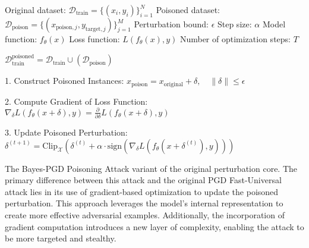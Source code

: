 Original dataset: $\mathcal{D}_{\text{train}} = \{(x_i, y_i)\}_{i=1}^{N}$  
Poisoned dataset: $\mathcal{D}_{\text{poison}} = \{(x_{\text{poison},j}, y_{\text{target},j})\}_{j=1}^{M}$  
Perturbation bound: $\epsilon$  
Step size: $\alpha$  
Model function: $f_{\theta}(x)$  
Loss function: $L(f_{\theta}(x), y)$  
Number of optimization steps: $T$


$ \mathcal{D}_{\text{train}}^{\text{poisoned}} = \mathcal{D}_{\text{train}} \cup (\mathcal{D}_{\text{poison}}) $

1. Construct Poisoned Instances:  
   $x_{\text{poison}} = x_{\text{original}} + \delta, \quad \|\delta\| \leq \epsilon$  

2. Compute Gradient of Loss Function:  
   $\nabla_\delta L(f_\theta(x + \delta), y) = \frac{\partial}{\partial \delta} L(f_\theta(x + \delta), y)$  

3. Update Poisoned Perturbation:  
   $\delta^{(t+1)} = \text{Clip}_{\mathcal{X}} (\delta^{(t)} + \alpha \cdot \text{sign}(\nabla_\delta L(f_\theta(x + \delta^{(t)}), y)))$

The Bayes-PGD Poisoning Attack variant of the original perturbation core. The primary difference between this attack and the original PGD Fast-Universal attack lies in its use of gradient-based optimization to update the poisoned perturbation. This approach leverages the model's internal representation to create more effective adversarial examples. Additionally, the incorporation of gradient computation introduces a new layer of complexity, enabling the attack to be more targeted and stealthy.